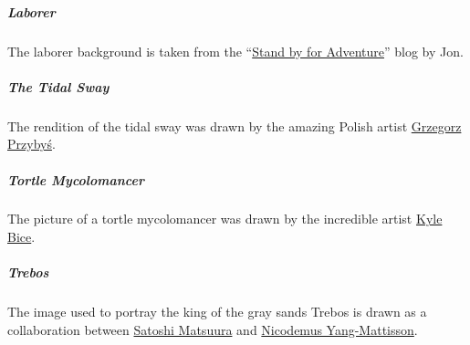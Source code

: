     \subparagraph{Laborer} The laborer background is taken from the ``\href{https://standbyforadventure.blogspot.com/2014/08/d-background-laborer.html}{Stand by for Adventure}'' blog by Jon.

    \subparagraph{The Tidal Sway} The rendition of the tidal sway was drawn by the amazing Polish artist \href{https://grzegorzprzybys.artstation.com/}{Grzegorz Przybyś}.

    \subparagraph{Tortle Mycolomancer} The picture of a tortle mycolomancer was drawn by the incredible artist \href{https://twitter.com/KyleBice}{Kyle Bice}.

    \subparagraph{Trebos} The image used to portray the king of the gray sands Trebos is drawn as a collaboration between \href{https://www.artstation.com/hiziripro}{Satoshi Matsuura} and \href{https://www.artstation.com/nicodemus}{Nicodemus Yang-Mattisson}.
